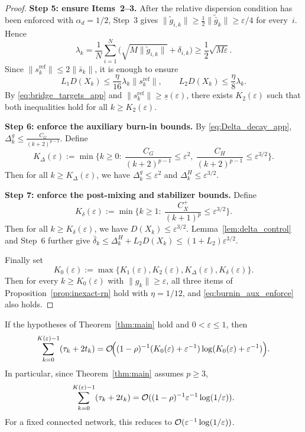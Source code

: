 \documentclass[review,onefignum,onetabnum]{siamart171218}
\begin{document}
\begin{proof}
		\smallskip
		\noindent\textbf{Step 5: ensure Items~2--3.}
		After the relative dispersion condition has been enforced with
		$\alpha_d=1/2$, Step~3 gives
		$\|\tilde g_{i,k}\|\ge \frac12\|\tilde{\bar g}_k\|\ge \varepsilon/4$
		for every~$i$.
		Hence
		\[
		\lambda_k=\frac1N\sum_{i=1}^N
		\bigl(\sqrt{M\|\tilde g_{i,k}\|}+\delta_{i,k}\bigr)
		\ge \frac12\sqrt{M\varepsilon}.
		\]
		Since $\|s_k^{\mathrm{ref}}\|\le 2\|\bar s_k\|$, it is enough to ensure
		\[
		L_1D(X_k)\le \frac{\eta}{16}\lambda_k\|s_k^{\mathrm{ref}}\|,
		\qquad
		L_2D(X_k)\le \frac{\eta}{8}\lambda_k.
		\]
		By \eqref{eq:bridge_targets_app} and $\|s_k^{\mathrm{ref}}\|\ge \underline s(\varepsilon)$, there exists $K_2(\varepsilon)$ such that both inequalities hold for all $k\ge K_2(\varepsilon)$.
		
		\smallskip
		\noindent\textbf{Step 6: enforce the auxiliary burn-in bounds.}
		By \eqref{eq:Delta_decay_app}, $\Delta_k^g\le \frac{C_G}{(k+2)^{p-1}}$.
		Define
		\[
		K_\Delta(\varepsilon):=\min\Big\{k\ge 0:\ 
		\frac{C_G}{(k+2)^{p-1}}\le \varepsilon^2,\ 
		\frac{C_H}{(k+2)^{p-1}}\le \varepsilon^{3/2}\Big\}.
		\]
		Then for all $k\ge K_\Delta(\varepsilon)$, we have
		$\Delta_k^g\le \varepsilon^2$ and
		$\Delta_k^H\le \varepsilon^{3/2}$.
		
		\smallskip
		\noindent\textbf{Step 7: enforce the post-mixing and stabilizer bounds.}
		Define
		\[
		K_\delta(\varepsilon):=\min\Big\{k\ge 1:\ 
		\frac{C_X^{+}}{(k+1)^p}\le \varepsilon^{3/2}\Big\}.
		\]
		Then for all $k\ge K_\delta(\varepsilon)$, we have
		$D(X_k)\le \varepsilon^{3/2}$. Lemma~\ref{lem:delta_control}
		and Step~6 further give
		$\bar\delta_k\le \Delta_k^H+L_2D(X_k)
		\le (1+L_2)\varepsilon^{3/2}$.
		
		\smallskip
		Finally set
		\[
		K_0(\varepsilon):=\max\{K_1(\varepsilon),K_2(\varepsilon),K_\Delta(\varepsilon),K_\delta(\varepsilon)\}.
		\]
		Then for every $k\ge K_0(\varepsilon)$ with $\|g_k\|\ge \varepsilon$, all three items of Proposition~\ref{prop:inexact-rn} hold with $\eta=1/12$,
		and \eqref{eq:burnin_aux_enforce} also holds.
	\end{proof}
	
	\begin{theorem}\label{thm:comm}
		If the hypotheses of Theorem~\ref{thm:main} hold and
		$0<\varepsilon\le1$, then
		\[
		\sum_{k=0}^{K(\varepsilon)-1}(\tau_k+2t_k)
		=\mathcal{O}\!\Big((1-\rho)^{-1}
		(K_0(\varepsilon)+\varepsilon^{-1})
		\log(K_0(\varepsilon)+\varepsilon^{-1})\Big).
		\]
		In particular, since Theorem~\ref{thm:main} assumes $p\ge3$,
		\[
		\sum_{k=0}^{K(\varepsilon)-1}(\tau_k+2t_k)
		=\mathcal{O}((1-\rho)^{-1}\varepsilon^{-1}\log(1/\varepsilon)).
		\]
		For a fixed connected network, this reduces to
		$\mathcal{O}(\varepsilon^{-1}\log(1/\varepsilon))$.
	\end{theorem}
	
\end{document}
